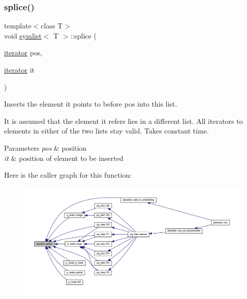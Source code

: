 \subsubsection{\texorpdfstring{splice()}{splice()}\hspace{0.1cm}{\footnotesize\ttfamily [1/2]}}
{\footnotesize\ttfamily template$<$class T$>$ \\
void \mbox{\hyperlink{classsymlist}{symlist}}$<$ T $>$\+::splice (\begin{DoxyParamCaption}\item[{\mbox{\hyperlink{classsymlist_a66045fbe3d98975e5537092ede8b50df}{iterator}}}]{pos,  }\item[{\mbox{\hyperlink{classsymlist_a66045fbe3d98975e5537092ede8b50df}{iterator}}}]{it }\end{DoxyParamCaption})}



Inserts the element {\ttfamily it} points to before {\ttfamily pos} into this list. 

It is assumed that the element {\ttfamily it} refers lies in a different list. All iterators to elements in either of the two lists stay valid. Takes constant time.


\begin{DoxyParams}{Parameters}
{\em pos} & position \\
\hline
{\em it} & position of element to be inserted \\
\hline
\end{DoxyParams}
Here is the caller graph for this function\+:\nopagebreak
\begin{figure}[H]
\begin{center}
\leavevmode
\includegraphics[width=350pt]{classsymlist_ac2bd4d9db62ea6a3282662c62a97c3b2_icgraph}
\end{center}
\end{figure}
\mbox{\label{classsymlist_a27889c85e97c1e8dec7a871987a12b29}} 
